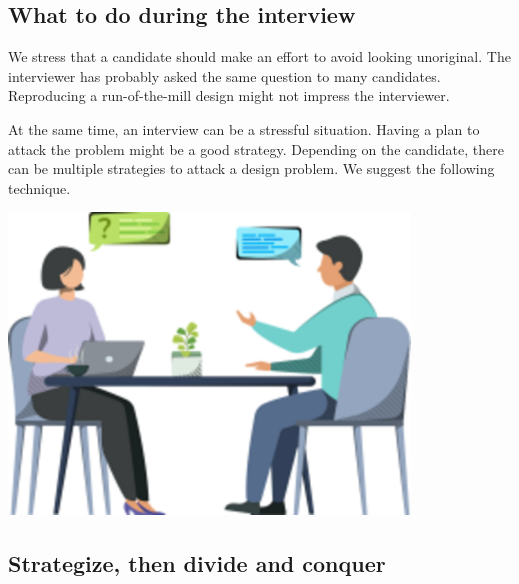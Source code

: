 

\subsection{What to do during the interview}\label{OqS9se5xWdgf5aMw0iG-c}

\noindent
\begin{minipage}[t]{0.48\textwidth}
We stress that a candidate should make an effort to avoid looking unoriginal. The interviewer has probably asked the same question to many candidates. Reproducing a run-of-the-mill design might not impress the interviewer.

At the same time, an interview can be a stressful situation. Having a plan to attack the problem might be a good strategy. Depending on the candidate, there can be multiple strategies to attack a design problem. We suggest the following technique.
\end{minipage}
\hfill
\begin{minipage}[t]{0.48\textwidth}
\includegraphics[width=0.8\textwidth]{Images/chapter_1/section_6043988183744512/4723557555109888.png}
\end{minipage}

\subsection{Strategize, then divide and conquer}\label{jom-qAPDCZXkgozsRojYf}

